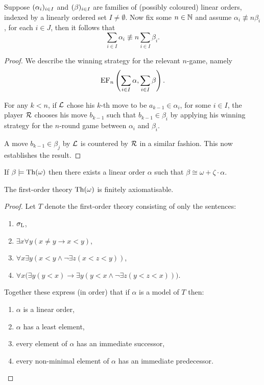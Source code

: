 \begin{lem}\label{lem:fvsum}
	Suppose $(\alpha_i)_{i\in I}$ and $(\beta)_{i\in I}$ are families of (possibly coloured) linear orders, indexed by a linearly ordered set $I\neq\emptyset$.  Now fix some $n\in\mathbb{N}$ and assume $\alpha_i\nequiv{n}\beta_i$, for each $i\in J$, then it follows that
	\begin{equation}
		\sum_{i\in I}\alpha_i\nequiv{n}\sum_{i\in I}\beta_i.
	\end{equation}
\end{lem}
\begin{proof}
	We describe the winning strategy for the relevant $n$-game, namely
	\begin{equation}
		\operatorname{EF}_n\left(\sum_{i\in I}\alpha,\sum_{i\in I}\beta\right).
	\end{equation}

	For any $k<n$, if $\mathcal{L}$ chose his $k$-th move to be $a_{k-1}\in\alpha_i$, for some $i\in I$, the player $\mathcal{R}$ chooses his move $b_{k-1}$ such that $b_{k-1}\in\beta_i$ by applying his winning strategy for the $n$-round game between $\alpha_i$ and $\beta_i$.

	A move $b_{k-1}\in\beta_j$ by $\mathcal{L}$ is countered by $\mathcal{R}$ in a similar fashion.  This now establishes the result.
\end{proof}

\begin{prp}
	If $\beta\models\operatorname{Th}(\omega)$ then there exists a linear order $\alpha$ such that $\beta\cong\omega+\zeta\cdot\alpha$.
\end{prp}

\begin{prp}\label{prp:omega}
	The first-order theory $\operatorname{Th}(\omega)$ is finitely axiomatisable.
\end{prp}
\begin{proof}
	Let $T$ denote the first-order theory consisting of only the sentences:
	\begin{enumerate}
		\item	$\sigma_{\mathrm{L}}$,
		\item	$\exists x\forall y(x\neq y\rightarrow x<y)$,
		\item	$\forall x\exists y(x<y\wedge\neg\exists z(x<z<y))$,
		\item	$\forall x\big(\exists y(y<x)\rightarrow\exists y(y<x\wedge\neg\exists z(y<z<x))\big)$.
	\end{enumerate}
	Together these express (in order) that if $\alpha$ is a model of $T$ then:
	\begin{enumerate}
		\item	$\alpha$ is a linear order,
		\item	$\alpha$ has a least element,
		\item	every element of $\alpha$ has an immediate successor,
		\item	every non-minimal element of $\alpha$ has an immediate predecessor.
	\end{enumerate}
\end{proof}


